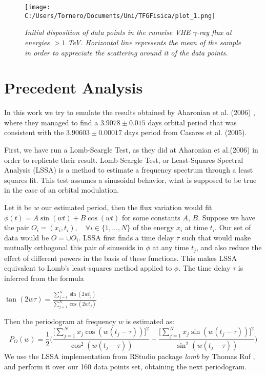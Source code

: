 \documentclass[twocolumn]{revtex4}
\begin{document}
\begin{figure}[h!]
\centering
\texttt{[image: C:/Users/Tornero/Documents/Uni/TFGFisica/plot\_1.png]}
\caption{\textit{Initial disposition of data points in the runwise VHE $\gamma$-ray flux at energies $>1$ TeV. Horizontal line represents the mean of the sample in order to appreciate the scattering around it of the data points.}}
\label{fig:sample}
\end{figure}

\section{ Precedent Analysis}

In this work we try to emulate the results obtained by Aharonian et al. (2006) \cite{aharonian}, where they managed to find a $3.9078 \pm 0.015$ days orbital period that was consistent with the $3.90603 \pm 0.00017$ days period from Casares et al. (2005).

First, we have run a Lomb-Scargle Test, as they did at Aharonian et al.(2006) in order to replicate their result. Lomb-Scargle Test, or Least-Squares Spectral Analysis (LSSA) is a method to estimate a frequency spectrum through a least squares fit. This test assumes a sinusoidal behavior, what is supposed to be true in the case of an orbital modulation.

Let it be $w$ our estimated period, then the flux variation would fit $\phi(t) = A \sin(wt) + B \cos(wt)$ for some constants $A$, $B$. Suppose we have the pair $O_i=(x_i, t_i), \quad \forall i \in \{1, \ldots, N\}$ of the energy $x_i$ at time $t_i$. Our set of data would be $\displaystyle O=\cup O_i$. LSSA first finds a time delay $\tau$ such that would make mutually orthogonal this pair of sinusoids in $\phi$ at any time $t_j$, and also reduce the effect of different powers in the basis of these functions. This makes LSSA equivalent to Lomb's least-squares method applied to $\phi$. The time delay $\tau$ is inferred from the formula
\begin{center}
$
\tan (2 w \tau) = \frac{\sum\limits_{j=1}^{N} \sin (2 w t_j)}{\sum\limits_{j=1}^{N} \cos (2 w t_j)}
$
\end{center}

Then the periodogram at frequency $w$ is estimated as:
{\small
$$
P_O(w) =\frac{1}{2}\Bigg( \frac{\big[\sum\limits_{j=1}^{N} x_j \cos(w(t_j - \tau)) \big]^2}{\cos^2(w(t_j - \tau))} + \frac{\big[\sum\limits_{j=1}^{N} x_j \sin(w(t_j - \tau))\big]^2}{\sin^2(w(t_j - \tau))} \Bigg)
$$
}
We use the LSSA implementation from RStudio package \textit{lomb} by Thomas Ruf \cite{lomb}, and perform it over our 160 data points set, obtaining the next periodogram.
\end{document}
